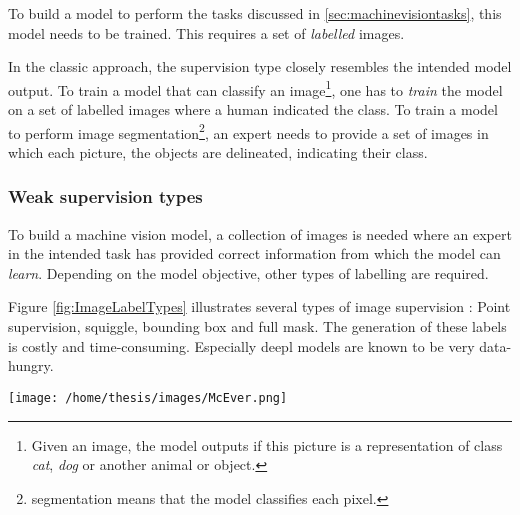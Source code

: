 To build a model to perform the tasks discussed in \ref{sec:machinevisiontasks}, this model needs to be trained.
This requires a set of \textit{labelled} images. 

In the classic approach, the supervision type closely resembles the intended model output.
To train a model that can classify an image\footnote{Given an image, the model outputs if this picture is a representation of class \textit{cat}, \textit{dog} or another animal or object. }, 
one has to \textit{train} the model on a set of labelled images where a human indicated the class.
To train a model to perform image segmentation\footnote{segmentation means that the model classifies each pixel.}, an expert needs to provide a set of images in which
each picture, the objects are delineated, indicating their class.  



\subsubsection{Weak supervision types}


To build a machine vision model, a collection of images is needed where an expert in the intended task has provided correct information from which the model can \textit{learn}.
Depending on the model objective, other types of labelling are required.


Figure \ref{fig:ImageLabelTypes} illustrates several types of image supervision : 
Point supervision, squiggle, bounding box and full mask.
The generation of these labels is costly and time-consuming.
Especially \gls{deepl} models are known to be very data-hungry. 

\begin{SCfigure}[][htb]
    \centering
    \texttt{[image: /home/thesis/images/McEver.png]}
    \caption{Four different annotation types \cite{McEver2020}: 
    On the top left the picture is point level annotated. The points are inflated for visibility.
    On the top right, squiggle annotation is used.
    The bottom left shows bounding box supervion.
    While the bottom right image is fully annotated.
    An image level label would indicate that there are multiple instances of \textit{person} and \textit{bike} in the image.
    \label{fig:ImageLabelTypes}}
\end{SCfigure}

